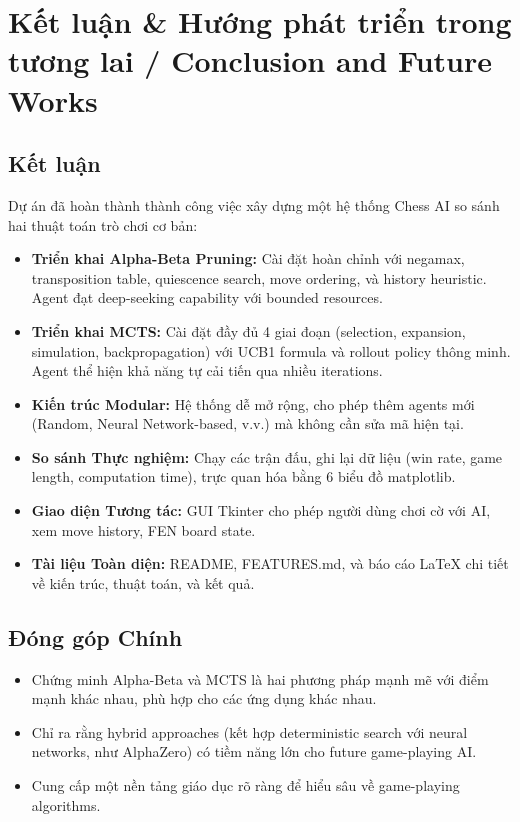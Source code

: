 \section{Kết luận \& Hướng phát triển trong tương lai / Conclusion and Future Works}

\subsection{Kết luận}
Dự án đã hoàn thành thành công việc xây dựng một hệ thống Chess AI so sánh hai thuật toán trò chơi cơ bản:

\begin{itemize}
    \item \textbf{Triển khai Alpha-Beta Pruning:} Cài đặt hoàn chỉnh với negamax, transposition table, quiescence search, move ordering, và history heuristic. Agent đạt deep-seeking capability với bounded resources.

    \item \textbf{Triển khai MCTS:} Cài đặt đầy đủ 4 giai đoạn (selection, expansion, simulation, backpropagation) với UCB1 formula và rollout policy thông minh. Agent thể hiện khả năng tự cải tiến qua nhiều iterations.

    \item \textbf{Kiến trúc Modular:} Hệ thống dễ mở rộng, cho phép thêm agents mới (Random, Neural Network-based, v.v.) mà không cần sửa mã hiện tại.

    \item \textbf{So sánh Thực nghiệm:} Chạy các trận đấu, ghi lại dữ liệu (win rate, game length, computation time), trực quan hóa bằng 6 biểu đồ matplotlib.

    \item \textbf{Giao diện Tương tác:} GUI Tkinter cho phép người dùng chơi cờ với AI, xem move history, FEN board state.

    \item \textbf{Tài liệu Toàn diện:} README, FEATURES.md, và báo cáo LaTeX chi tiết về kiến trúc, thuật toán, và kết quả.
\end{itemize}

\subsection{Đóng góp Chính}
\begin{itemize}
    \item Chứng minh Alpha-Beta và MCTS là hai phương pháp mạnh mẽ với điểm mạnh khác nhau, phù hợp cho các ứng dụng khác nhau.
    \item Chỉ ra rằng hybrid approaches (kết hợp deterministic search với neural networks, như AlphaZero) có tiềm năng lớn cho future game-playing AI.
    \item Cung cấp một nền tảng giáo dục rõ ràng để hiểu sâu về game-playing algorithms.
\end{itemize}

